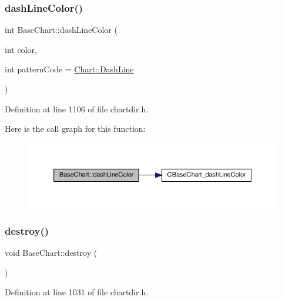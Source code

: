 \subsubsection{\texorpdfstring{dash\+Line\+Color()}{dashLineColor()}}
{\footnotesize\ttfamily int Base\+Chart\+::dash\+Line\+Color (\begin{DoxyParamCaption}\item[{int}]{color,  }\item[{int}]{pattern\+Code = {\ttfamily \hyperlink{namespace_chart_a5ae3d159f02ffed01fcc4e63793dea7da11e22a06cf50415c9f8c799ce6ecd671}{Chart\+::\+Dash\+Line}} }\end{DoxyParamCaption})\hspace{0.3cm}{\ttfamily [inline]}}



Definition at line 1106 of file chartdir.\+h.

Here is the call graph for this function\+:
\nopagebreak
\begin{figure}[H]
\begin{center}
\leavevmode
\includegraphics[width=350pt]{class_base_chart_af13e897adc780569cd048d997f7c59c6_cgraph}
\end{center}
\end{figure}
\mbox{\label{class_base_chart_a6dbf6be38231b40b064357475d0e7866}} 
\subsubsection{\texorpdfstring{destroy()}{destroy()}}
{\footnotesize\ttfamily void Base\+Chart\+::destroy (\begin{DoxyParamCaption}{ }\end{DoxyParamCaption})\hspace{0.3cm}{\ttfamily [inline]}}



Definition at line 1031 of file chartdir.\+h.

\mbox{\label{class_base_chart_ae67229acd792aee7a5b73ac258c6de3f}} 
